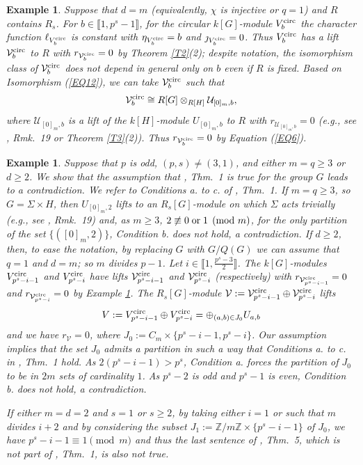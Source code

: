 \documentclass[11pt]{amsart}
\newtheorem{ex}[theorem]{Example}
\def\circul{\textup{circ}}
\begin{document}
\begin{ex}\normalfont\label{EX4}
Suppose that $d=m$ (equivalently, $\chi$ is injective or $q=1$) and $R$ contains $R_s$. For $b\in\llbracket1,p^s-1\rrbracket$, for the circular $k[G]$-module $V_b^{\circul}$ the character function $\ell_{V_b^{\circul}}$ is constant with $\eta_{V_b^{\circul}}=b$ and $\jmath_{V_b^{\circul}}=0$. Thus $V_b^{\circul}$ has a lift $\mathcal V_b^{\circul}$ to $R$ with $r_{\mathcal V_b^{\circul}}=0$ by Theorem \ref{T2}(2); despite notation, the isomorphism class of $\mathcal V_b^{\circul}$ does not depend in general only on $b$ even if $R$ is fixed. Based on Isomorphism (\ref{EQ12}), we can take $\mathcal V_b^{\circul}$ such that
$$\mathcal V_b^{\circul}\cong R[G]\otimes_{R[H]} \mathcal U_{[0]_m,b},$$
where $\mathcal U_{[0]_m,b}$ is a lift of the $k[H]$-module $U_{[0]_m,b}$ to $R$ with $r_{\mathcal U_{[0]_m,b}}=0$ (e.g., see \cite{KT1}, Rmk.\ 19 or Theorem \ref{T3}(2)). Thus $r_{\mathcal V_b^{\circul}}=0$ by Equation (\ref{EQ6}).
\end{ex}

\begin{ex}\normalfont\label{EX5}
Suppose that $p$ is odd, $(p,s)\neq (3,1)$, and either $m=q\ge 3$ or $d\ge 2$. We show that the assumption that \cite{KT1}, Thm.\ 1 is true for the group $G$ leads to a contradiction. We refer to Conditions a. to c. of \cite{KT1}, Thm.\ 1. If $m=q\ge 3$, so $G=\Sigma\times H$, then $U_{[0]_m,2}$ lifts to an $R_s[G]$-module on which $\Sigma$ acts trivially (e.g., see \cite{KT1}, Rmk.\ 19) and, as $m\ge 3$, $2\not\equiv 0\;\textup{or}\;1\pmod{m}$, for the only partition of the set $\{([0]_m,2)\}$, Condition b. does not hold, a contradiction. If $d\ge 2$, then, to ease the notation, by replacing $G$ with $G/Q(G)$ we can assume that $q=1$ and $d=m$; so $m$ divides $p-1$. Let $i\in\llbracket1,\frac{p^s-3}{2}\rrbracket$. The $k[G]$-modules $V_{p^s-i-1}^{\circul}$ and $V_{p^s-i}^{\circul}$ have lifts $\mathcal V_{p^s-i-1}^{\circul}$ and $\mathcal V_{p^s-i}^{\circul}$ (respectively) with $r_{\mathcal V_{p^s-i-1}^{\circul}}=0$ and $r_{\mathcal V_{p^s-i}^{\circul}}=0$ by Example \ref{EX4}. The $R_s[G]$-module $\mathcal V:=\mathcal V_{p^s-i-1}^{\circul}\oplus\mathcal V_{p^s-i}^{\circul}$ lifts 
$$V:=V_{p^s-i-1}^{\circul}\oplus V_{p^s-i}^{\circul}=\oplus_{(a,b)\in J_0} U_{a,b}$$
and we have $r_{\mathcal V}=0$, where $ J_0:=C_m\times\{p^s-i-1,p^s-i\}$. Our assumption implies that the set $ J_0$ admits a partition in such a way that Conditions a. to c. in \cite{KT1}, Thm.\ 1 hold. As $2(p^s-i-1)>p^s$, Condition a. forces the partition of $ J_0$ to be in $2m$ sets of cardinality $1$. As $p^s-2$ is odd and $p^s-1$ is even, Condition b. does not hold, a contradiction. 

If either $m=d=2$ and $s=1$ or $s\ge 2$, by taking either $i=1$ or such that $m$ divides $i+2$ and by considering the subset $J_1:=\mathbb Z/m\mathbb Z\times\{p^s-i-1\}$ of $ J_0$, we have $p^s-i-1\equiv 1 \pmod{m}$ and thus the last sentence of \cite{KT2}, Thm.\ 5, which is not part of \cite{KT1}, Thm.\ 1, is also not true.\end{ex}
\end{document}
